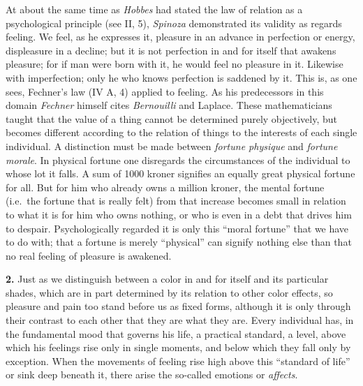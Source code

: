 \documentclass[12pt,a4paper]{book}
\newcommand{\opage}[1]{\marginnote{\footnotesize\textit{[#1]}}}
\begin{document}
At about the same time as \emph{Hobbes} had stated the law of relation
as a psychological principle (see II, 5), \emph{Spinoza} demonstrated
its validity as regards feeling. We feel, as he expresses it, pleasure
in an advance in perfection or energy, displeasure in a decline; but it
is not perfection in and for itself that awakens pleasure; for if man
were born with it, he would feel no pleasure in it. Likewise with
imperfection; only he who knows perfection is saddened by it. This is,
as one sees, Fechner's law (IV A, 4) applied to feeling. As his
predecessors in this domain \emph{Fechner} himself cites
\emph{Bernouilli} and Laplace. These mathematicians taught that the
value of a thing cannot be determined purely objectively, but becomes
different according to the relation of things to the interests of each
single individual. A distinction must be made between \textit{fortune
physique} and \textit{fortune morale}. In physical fortune one
disregards the circumstances of the individual to whose lot it falls. A
sum of 1000 kroner signifies an equally great physical fortune for all.
But for him who already owns a million kroner, the
\opage{327}mental fortune (i.e.\ the fortune that is really felt) from
that increase becomes small in relation to what it is for him who owns
nothing, or who is even in a debt that drives him to despair.
Psychologically regarded it is only this ``moral fortune'' that we have
to do with; that a fortune is merely ``physical'' can signify nothing
else than that no real feeling of pleasure is awakened.

\textbf{2.} Just as we distinguish between a color in and for itself
and its particular shades, which are in part determined by its relation
to other color effects, so pleasure and pain too stand before us as
fixed forms, although it is only through their contrast to each other
that they are what they are. Every individual has, in the fundamental
mood that governs his life, a practical standard, a level, above which
his feelings rise only in single moments, and below which they fall
only by exception. When the movements of feeling rise high above this
``standard of life'' or sink deep beneath it, there arise the so-called
emotions or \emph{affects}.
\end{document}
